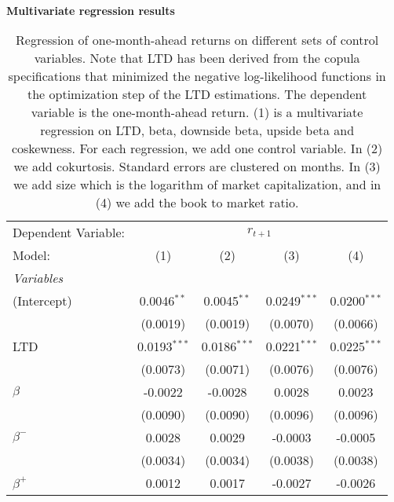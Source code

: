 \begin{table}[H]
\caption{\\ \large{\textbf{Multivariate regression results}}}
\captionsetup{justification = justified, width = \linewidth}
\caption*{Regression of one-month-ahead returns on different
                               sets of control variables. Note that LTD has been derived from the 
                               copula specifications that minimized the negative log-likelihood functions
                               in the optimization step of the LTD estimations. The dependent variable is
                               the one-month-ahead return. (1) is a multivariate 
                               regression on LTD, beta, downside beta, upside beta and coskewness. For each regression, we
                               add one control variable. In (2) we add cokurtosis. 
                               Standard errors are clustered on months. In (3) we add size which is the 
                               logarithm of market capitalization, and in (4) we add the book to market ratio.}
   \centering
\label{reg_clustered_on_time_2_size_bm_nll}
   \begin{tabular}{lcccc}
      \tabularnewline \midrule \midrule
      Dependent Variable: & \multicolumn{4}{c}{$r_{t+1}$}\\
      Model:         & (1)            & (2)            & (3)            & (4)\\  
      \midrule
      \emph{Variables}\\
      (Intercept)    & 0.0046$^{**}$  & 0.0045$^{**}$  & 0.0249$^{***}$ & 0.0200$^{***}$\\   
                     & (0.0019)       & (0.0019)       & (0.0070)       & (0.0066)\\   
      LTD            & 0.0193$^{***}$ & 0.0186$^{***}$ & 0.0221$^{***}$ & 0.0225$^{***}$\\   
                     & (0.0073)       & (0.0071)       & (0.0076)       & (0.0076)\\   
      $\beta$        & -0.0022        & -0.0028        & 0.0028         & 0.0023\\   
                     & (0.0090)       & (0.0090)       & (0.0096)       & (0.0096)\\   
      $\beta^{-}$    & 0.0028         & 0.0029         & -0.0003        & -0.0005\\   
                     & (0.0034)       & (0.0034)       & (0.0038)       & (0.0038)\\   
      $\beta^{+}$    & 0.0012         & 0.0017         & -0.0027        & -0.0026\\   

\end{tabular}
\end{table}
